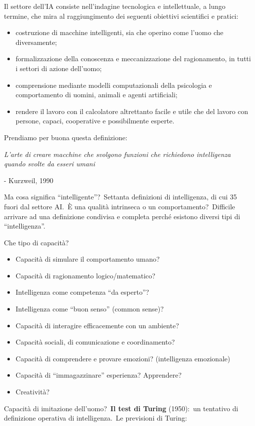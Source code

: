 Il settore dell'IA consiste nell'indagine tecnologica e intellettuale, a lungo termine, che mira al raggiungimento dei seguenti obiettivi scientifici e pratici:
\begin{itemize}
	\item costruzione di macchine intelligenti, sia che operino come l'uomo che diversamente;
	\item formalizzazione della conoscenza e meccanizzazione del ragionamento, in tutti i settori di azione dell'uomo;
	\item comprensione mediante modelli computazionali della psicologia e comportamento di uomini, animali e agenti artificiali;
	\item rendere il lavoro con il calcolatore altrettanto facile e utile che del lavoro con persone, capaci, cooperative e possibilmente esperte.
\end{itemize}
Prendiamo per buona questa definizione:
\begin{center}
	\textit{L'arte di creare macchine che svolgono funzioni che richiedono intelligenza quando svolte da esseri umani}

	- Kurzweil, 1990
\end{center}
Ma cosa significa ``intelligente''?\ Settanta definizioni di intelligenza, di cui 35 fuori dal settore AI.\
È una qualità intrinseca o un comportamento?\
Difficile arrivare ad una definizione condivisa e completa perché esistono diversi tipi di ``intelligenza''.

Che tipo di capacità?
\begin{itemize}
	\item Capacità di simulare il comportamento umano?
	\item Capacità di ragionamento logico/matematico?
	\item Intelligenza come competenza ``da esperto''?
	\item Intelligenza come ``buon senso'' (common sense)?
	\item Capacità di interagire efficacemente con un ambiente?
	\item Capacità sociali, di comunicazione e coordinamento?
	\item Capacità di comprendere e provare emozioni? (intelligenza emozionale)
	\item Capacità di ``immagazzinare'' esperienza? Apprendere?
	\item Creatività?
\end{itemize}
Capacità di imitazione dell'uomo?\
\textbf{Il test di Turing} (1950):\ un tentativo di definizione operativa di intelligenza.\
Le previsioni di Turing:

